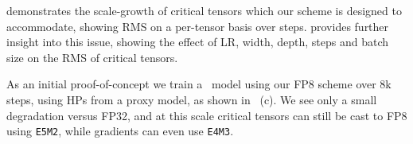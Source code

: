  demonstrates the scale-growth of critical tensors which our scheme is designed to accommodate, showing RMS on a per-tensor basis over steps.  provides further insight into this issue, showing the effect of LR, width, depth, steps and batch size on the RMS of critical tensors.

As an initial proof-of-concept we train a \umup\ model using our FP8 scheme over 8k steps, using HPs from a proxy model, as shown in ~(c). We see only a small degradation versus FP32, and at this scale critical tensors can still be cast to FP8 using \texttt{E5M2}, while gradients can even use \texttt{E4M3}.







